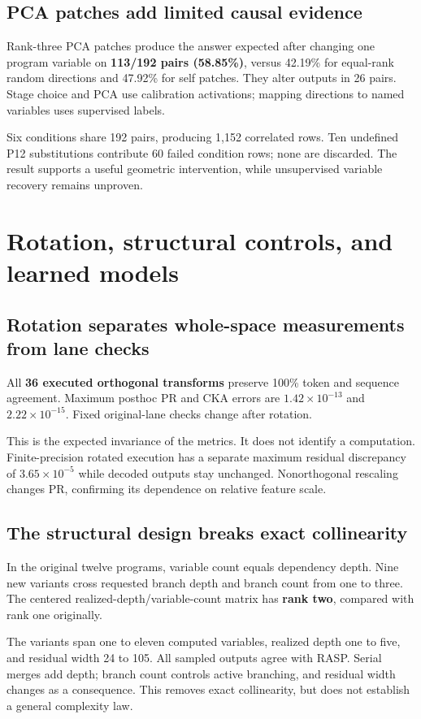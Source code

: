 \documentclass[11pt,a4paper]{article}
\newcommand{\newsection}[1]{\clearpage\section{#1}}
\begin{document}
\subsection*{PCA patches add limited causal evidence}
Rank-three PCA patches produce the answer expected after changing one program variable on \textbf{113/192 pairs (58.85\%)}, versus 42.19\% for equal-rank random directions and 47.92\% for self patches. They alter outputs in 26 pairs. Stage choice and PCA use calibration activations; mapping directions to named variables uses supervised labels.

Six conditions share 192 pairs, producing 1,152 correlated rows. Ten undefined P12 substitutions contribute 60 failed condition rows; none are discarded. The result supports a useful geometric intervention, while unsupervised variable recovery remains unproven.

\newsection{Rotation, structural controls, and learned models}
\subsection*{Rotation separates whole-space measurements from lane checks}
All \textbf{36 executed orthogonal transforms} preserve 100\% token and sequence agreement. Maximum posthoc PR and CKA errors are $1.42\times10^{-13}$ and $2.22\times10^{-15}$. Fixed original-lane checks change after rotation.

This is the expected invariance of the metrics. It does not identify a computation. Finite-precision rotated execution has a separate maximum residual discrepancy of $3.65\times10^{-5}$ while decoded outputs stay unchanged. Nonorthogonal rescaling changes PR, confirming its dependence on relative feature scale.

\subsection*{The structural design breaks exact collinearity}
In the original twelve programs, variable count equals dependency depth. Nine new variants cross requested branch depth and branch count from one to three. The centered realized-depth/variable-count matrix has \textbf{rank two}, compared with rank one originally.

The variants span one to eleven computed variables, realized depth one to five, and residual width 24 to 105. All sampled outputs agree with RASP. Serial merges add depth; branch count controls active branching, and residual width changes as a consequence. This removes exact collinearity, but does not establish a general complexity law.
\end{document}
